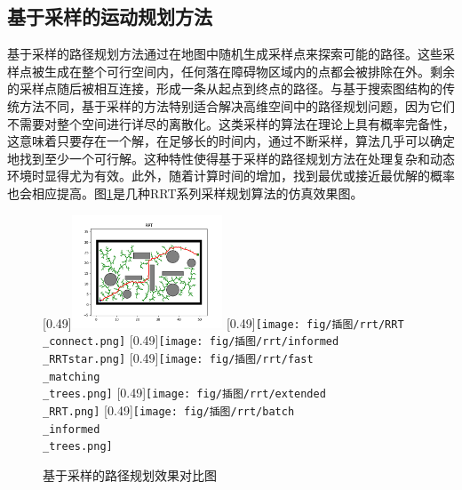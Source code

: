 \documentclass[master,academic]{ysuthesis} %
\begin{document}
		
		

		\subsection{基于采样的运动规划方法}
		基于采样的路径规划方法通过在地图中随机生成采样点来探索可能的路径。这些采样点被生成在整个可行空间内，任何落在障碍物区域内的点都会被排除在外。剩余的采样点随后被相互连接，形成一条从起点到终点的路径。与基于搜索图结构的传统方法不同，基于采样的方法特别适合解决高维空间中的路径规划问题，因为它们不需要对整个空间进行详尽的离散化。这类采样的算法在理论上具有概率完备性，这意味着只要存在一个解，在足够长的时间内，通过不断采样，算法几乎可以确定地找到至少一个可行解。这种特性使得基于采样的路径规划方法在处理复杂和动态环境时显得尤为有效。此外，随着计算时间的增加，找到最优或接近最优解的概率也会相应提高。图\ref{fig:基于采样的路径规划}是几种RRT系列采样规划算法的仿真效果图。
		\begin{figure}[H]
			\centering
			[0.49\textwidth]{\includegraphics[width=0.4\textwidth]{fig/插图/rrt/RRT.png}}
			[0.49\textwidth]{\texttt{[image: fig/插图/rrt/RRT\\\_connect.png]}}
			[0.49\textwidth]{\texttt{[image: fig/插图/rrt/informed\\\_RRTstar.png]}}
			[0.49\textwidth]{\texttt{[image: fig/插图/rrt/fast\\\_matching\\\_trees.png]}}
			[0.49\textwidth]{\texttt{[image: fig/插图/rrt/extended\\\_RRT.png]}}
			[0.49\textwidth]{\texttt{[image: fig/插图/rrt/batch\\\_informed\\\_trees.png]}}
			\caption{基于采样的路径规划效果对比图}
			\label{fig:基于采样的路径规划}
		\end{figure}
\end{document}
